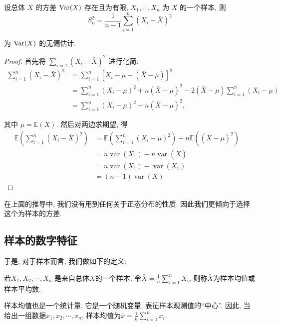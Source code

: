 \begin{theorem}
    设总体 $X$ 的方差 $\operatorname{Var}(X)$ 存在且为有限, $X_1, \cdots, X_n$ 为 $X$ 的一个样本, 则
$$
S_n^2=\frac{1}{n-1} \sum_{i=1}^n\left(X_i-\bar{X}\right)^2
$$

为 $\operatorname{Var}(X)$ 的无偏估计.
\end{theorem}

\begin{proof}
    首先将 $\sum_{i=1}\left(X_i-\bar{X}\right)^2$ 进行化简:
$$
\begin{aligned}
\sum_{i=1}^n\left(X_i-\bar{X}\right)^2&=\sum_{i=1}^n\left[X_i-\mu-(\bar{X}-\mu)\right]^2 & \\
& =\sum_{i=1}^n\left(X_i-\mu\right)^2+n(\bar{X}-\mu)^2-2(\bar{X}-\mu) \sum_{i=1}^n\left(X_i-\mu\right) \\
& =\sum_{i=1}^n\left(X_i-\mu\right)^2-n(\bar{X}-\mu)^2,
\end{aligned}
$$

其中 $\mu=\mathbb{E}(X)$. 然后对两边求期望, 得
$$
\begin{aligned}
\mathbb{E}\left(\sum_{i=1}^n\left(X_i-\bar{X}\right)^2\right)&=\mathbb{E}\left(\sum_{i=1}^n\left(X_i-\mu\right)^2\right)-n \mathbb{E}\left((\bar{X}-\mu)^2\right) \\
&=n \operatorname{var}\left(X_1\right)-n \operatorname{var}(\bar{X})&\\
&=n \operatorname{var}\left(X_1\right)-\operatorname{var}\left(X_1\right) \\
&=(n-1) \operatorname{var}(X)
\end{aligned}
$$
\end{proof}

在上面的推导中, 我们没有用到任何关于正态分布的性质. 因此我们更倾向于选择这个为样本的方差. 

\subsection{样本的数字特征}

于是, 对于样本而言, 我们做如下的定义: 

\begin{definition}
    若$X_1, X_2, \cdots, X_n$ 是来自总体$X$的一个样本, 令$\bar X = \frac 1n \sum_{i=1}^{n}X_i$, 则称$\bar X$为样本均值或样本平均数. 
\end{definition}

样本均值也是一个统计量. 它是一个随机变量, 表征样本观测值的``中心''. 因此, 当给出一组数据$x_1, x_2, \cdots, x_n$, 样本均值为$\bar x=\frac 1n \sum_{i=1}^n x_i$.

